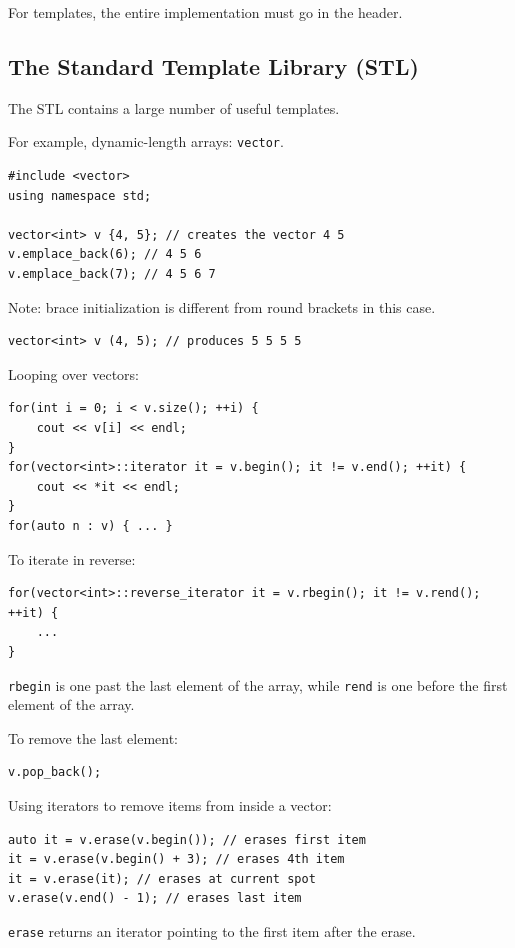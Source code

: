 \documentclass[11pt]{article}
\theoremstyle{definition}
\begin{document}
For templates, the entire implementation must go in the header.

\subsection{The Standard Template Library (STL)}
The STL contains a large number of useful templates.

For example, dynamic-length arrays: {\tt vector}.
\begin{lstlisting}
#include <vector>
using namespace std;

vector<int> v {4, 5}; // creates the vector 4 5
v.emplace_back(6); // 4 5 6
v.emplace_back(7); // 4 5 6 7
\end{lstlisting}
\vspace{-0.25cm}
Note: brace initialization is different from round brackets in this case.
\begin{lstlisting}
vector<int> v (4, 5); // produces 5 5 5 5
\end{lstlisting}
\vspace{-0.25cm}
Looping over vectors:
\begin{lstlisting}
for(int i = 0; i < v.size(); ++i) {
    cout << v[i] << endl;
}
for(vector<int>::iterator it = v.begin(); it != v.end(); ++it) {
    cout << *it << endl;
}
for(auto n : v) { ... }
\end{lstlisting}
\vspace{-0.25cm}
To iterate in reverse:
\begin{lstlisting}
for(vector<int>::reverse_iterator it = v.rbegin(); it != v.rend(); ++it) {
    ...
}
\end{lstlisting}
\vspace{-0.25cm}
{\tt rbegin} is one past the last element of the array, while {\tt rend} is one before the first element of the array.

To remove the last element:
\begin{lstlisting}
v.pop_back();
\end{lstlisting}
\vspace{-0.25cm}
Using iterators to remove items from inside a vector:
\begin{lstlisting}
auto it = v.erase(v.begin()); // erases first item
it = v.erase(v.begin() + 3); // erases 4th item
it = v.erase(it); // erases at current spot
v.erase(v.end() - 1); // erases last item
\end{lstlisting}
\vspace{-0.25cm}
{\tt erase} returns an iterator pointing to the first item after the erase.
\end{document}

